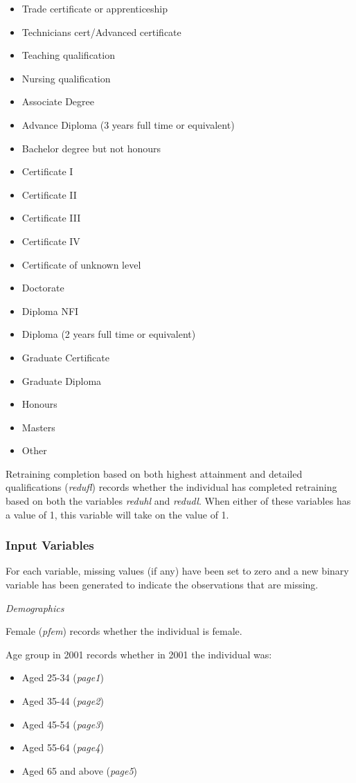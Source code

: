 \documentclass[12pt, a4paper]{article}
\begin{document}
\begin{itemize}
  \item Trade certificate or apprenticeship
  \item Technicians cert/Advanced certificate
  \item Teaching qualification 
  \item Nursing qualification 
  \item Associate Degree
  \item Advance Diploma (3 years full time or equivalent)
  \item Bachelor degree but not honours
  \item Certificate I
  \item Certificate II
  \item Certificate III
  \item Certificate IV
  \item Certificate of unknown level
  \item Doctorate
  \item Diploma NFI
  \item Diploma (2 years full time or equivalent)
  \item Graduate Certificate
  \item Graduate Diploma 
  \item Honours 
  \item Masters 
  \item Other 
\end{itemize}  

Retraining completion based on both highest attainment and detailed qualifications (\textit{redufl}) records whether the individual has completed retraining based on both the variables \textit{reduhl} and \textit{redudl}. When either of these variables has a value of 1, this variable will take on the value of 1. 

\subsubsection{Input Variables}
For each variable, missing values (if any) have been set to zero and a new binary variable has been generated to indicate the observations that are missing. 

\emph{Demographics}

Female (\textit{p\textunderscore{}fem}) records whether the individual is female. 

Age group in 2001 records whether in 2001 the individual was:
\begin{itemize}
  \item Aged 25-34 (\textit{p\textunderscore{}age1})
  \item Aged 35-44 (\textit{p\textunderscore{}age2})
  \item Aged 45-54 (\textit{p\textunderscore{}age3})
  \item Aged 55-64 (\textit{p\textunderscore{}age4})
  \item Aged 65 and above (\textit{p\textunderscore{}age5})
 \end{itemize} 
\end{document}
